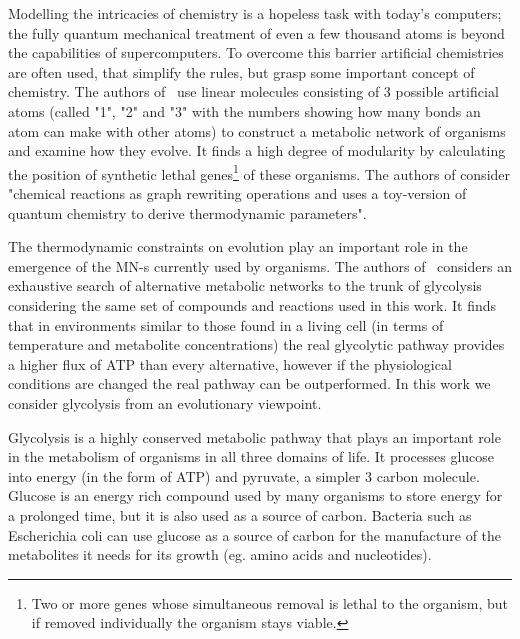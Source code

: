 \documentclass[a4paper,12pt]{article}
\begin{document}
	Modelling the intricacies of chemistry is a hopeless task with today's computers; the fully quantum mechanical treatment of even a few thousand atoms is beyond the capabilities of supercomputers. To overcome this barrier artificial chemistries are often used, that simplify the rules, but grasp some important concept of chemistry\cite{artificialreview}. The authors of~\cite{evolutioncomplex} use linear molecules consisting of 3 possible artificial atoms (called "1", "2" and "3" with the numbers showing how many bonds an atom can make with other atoms) to construct a metabolic network of organisms and examine how they evolve. It finds a high degree of modularity by calculating the position of synthetic lethal genes\footnote{Two or more genes whose simultaneous removal is lethal to the organism, but if removed individually the organism stays viable.} of these organisms. The authors of \cite{computationalframework} consider "chemical reactions as graph rewriting operations and uses a toy-version of quantum chemistry to derive thermodynamic parameters". %
	
	The thermodynamic constraints on evolution play an important role in the emergence of the MN-s currently used by organisms. The authors of~\cite{BartekLower} considers an exhaustive search of alternative metabolic networks to the trunk of glycolysis considering the same set of compounds and reactions used in this work. It finds that in environments similar to those found in a living cell (in terms of temperature and metabolite concentrations) the real glycolytic pathway provides a higher flux of ATP than every alternative, however if the physiological conditions are changed the real pathway can be outperformed. In this work we consider glycolysis from an evolutionary viewpoint. 


	

Glycolysis is a highly conserved metabolic pathway that plays an important role in the metabolism of organisms in all three domains of life. It processes glucose into energy (in the form of ATP) and pyruvate, a simpler 3 carbon molecule. Glucose is an energy rich compound used by many organisms to store energy for a prolonged time, but it is also used as a source of carbon. Bacteria such as Escherichia coli can use glucose as a source of carbon for the manufacture of the metabolites it needs for its growth (eg. amino acids and nucleotides)\cite[]{principlesofbio}.
\end{document}
